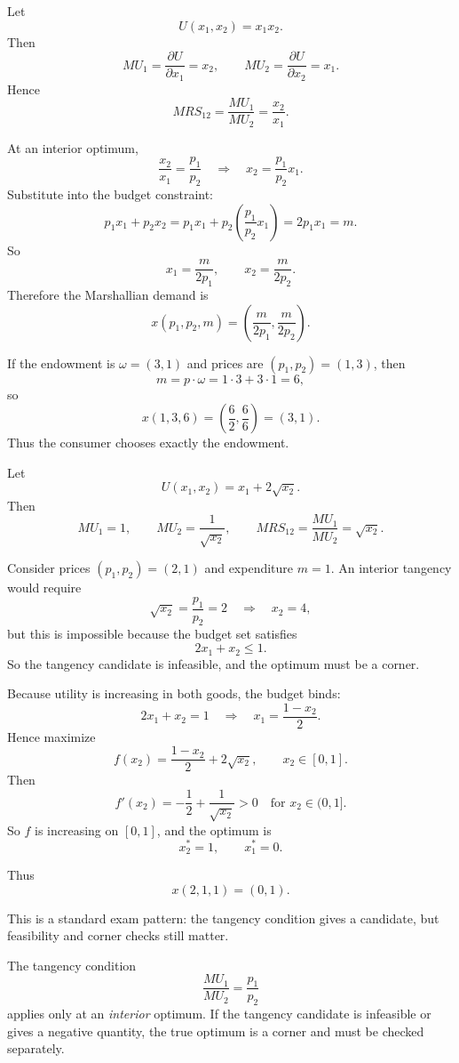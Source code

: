 \begin{examplebox}[title={Worked Example: Cobb--Douglas utility}]
Let
\[
U(x_1,x_2)=x_1x_2.
\]
Then
\[
MU_1=\frac{\partial U}{\partial x_1}=x_2,
\qquad
MU_2=\frac{\partial U}{\partial x_2}=x_1.
\]
Hence
\[
MRS_{12}=\frac{MU_1}{MU_2}=\frac{x_2}{x_1}.
\]

At an interior optimum,
\[
\frac{x_2}{x_1}=\frac{p_1}{p_2}
\quad \Longrightarrow \quad
x_2=\frac{p_1}{p_2}x_1.
\]
Substitute into the budget constraint:
\[
p_1x_1+p_2x_2
=
p_1x_1+p_2\left(\frac{p_1}{p_2}x_1\right)
=
2p_1x_1
=
m.
\]
So
\[
x_1=\frac{m}{2p_1},
\qquad
x_2=\frac{m}{2p_2}.
\]
Therefore the Marshallian demand is
\[
\boxed{
x(p_1,p_2,m)
=
\left(
\frac{m}{2p_1},
\frac{m}{2p_2}
\right).
}
\]

If the endowment is $\omega=(3,1)$ and prices are $(p_1,p_2)=(1,3)$, then
\[
m=p\cdot \omega = 1\cdot 3 + 3\cdot 1 = 6,
\]
so
\[
x(1,3,6)=\left(\frac{6}{2},\frac{6}{6}\right)=(3,1).
\]
Thus the consumer chooses exactly the endowment.
\end{examplebox}

\begin{examplebox}[title={Worked Example: quasilinear utility and corner logic}]
Let
\[
U(x_1,x_2)=x_1+2\sqrt{x_2}.
\]
Then
\[
MU_1=1,
\qquad
MU_2=\frac{1}{\sqrt{x_2}},
\qquad
MRS_{12}=\frac{MU_1}{MU_2}=\sqrt{x_2}.
\]

Consider prices $(p_1,p_2)=(2,1)$ and expenditure $m=1$. An interior tangency would require
\[
\sqrt{x_2}=\frac{p_1}{p_2}=2
\quad \Longrightarrow \quad
x_2=4,
\]
but this is impossible because the budget set satisfies
\[
2x_1+x_2\le 1.
\]
So the tangency candidate is infeasible, and the optimum must be a corner.

Because utility is increasing in both goods, the budget binds:
\[
2x_1+x_2=1
\quad \Longrightarrow \quad
x_1=\frac{1-x_2}{2}.
\]
Hence maximize
\[
f(x_2)=\frac{1-x_2}{2}+2\sqrt{x_2},
\qquad x_2\in[0,1].
\]
Then
\[
f'(x_2)=-\frac12+\frac{1}{\sqrt{x_2}}>0
\quad \text{for } x_2\in(0,1].
\]
So $f$ is increasing on $[0,1]$, and the optimum is
\[
x_2^*=1,\qquad x_1^*=0.
\]

Thus
\[
\boxed{x(2,1,1)=(0,1).}
\]

This is a standard exam pattern: the tangency condition gives a candidate, but feasibility and corner checks still matter.
\end{examplebox}

\begin{commonmistake}
The tangency condition
\[
\frac{MU_1}{MU_2}=\frac{p_1}{p_2}
\]
applies only at an \emph{interior} optimum. If the tangency candidate is infeasible or gives a negative quantity, the true optimum is a corner and must be checked separately.
\end{commonmistake}

